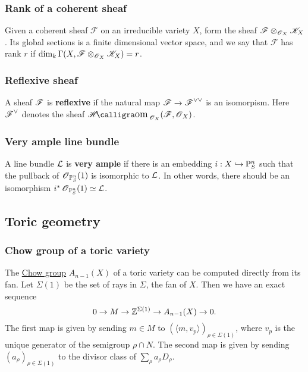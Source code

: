 \documentclass[11pt, english]{article}
\begin{document}
\subsubsection{Rank of a coherent sheaf}
\label{ranksheaf}

Given a coherent sheaf $\mathscr F$ on an irreducible variety $X$, form the sheaf ${\mathscr F \otimes_{\operatorname{\mathscr{O}}_X} \mathscr K_X}$. Its global sections is a finite dimensional vector space, and we say that $\mathscr F$ has rank $r$ if $\dim_k \Gamma(X,\mathscr F \otimes_{\operatorname{\mathscr{O}}_X} \mathscr K_X) = r$.

\subsubsection{Reflexive sheaf}
\label{reflexivesheaf}

A sheaf $\operatorname{\mathscr{F}}$ is \textbf{reflexive} if the natural map $\operatorname{\mathscr{F}} \to \operatorname{\mathscr{F}}^{\vee\vee}$ is an isomorpism. Here $\operatorname{\mathscr{F}}^\vee$ denotes the sheaf $\Shom_{\OO_X}(\FF,\OO_X)$.

\subsubsection{Very ample line bundle}
\label{veryample}
A line bundle $\mathcal{L}$ is \textbf{very ample} if there is an embedding $i:X \hookrightarrow \mathbb{P}_S^n$ such that the pullback of $\operatorname{\mathscr{O}}_{\mathbb{P}_S^n}(1)$ is isomorphic to $\mathcal{L}$. In other words, there should be an isomorphism $i^\ast \operatorname{\mathscr{O}}_{\mathbb{P}^n_S}(1) \simeq \mathcal{L}$.

\subsection{Toric geometry}

\subsubsection{Chow group of a toric variety}
\label{chowtoric}

The \hyperref[chowgroup]{Chow group} $A_{n-1}(X)$ of a toric variety can be computed directly from its fan. Let $\Sigma(1)$ be the set of rays in $\Sigma$, the fan of $X$. Then we have an exact sequence
\[
 0 \to M \to \mathbb{Z}^{\Sigma(1)} \to A_{n-1}(X) \to 0.
\] 
The first map is given by sending $m \in M$ to $(\langle m,v_p \rangle )_{\rho \in \Sigma(1)}$, where $v_p$ is the unique generator of the semigroup $\rho \cap N$. The second map is given by sending $(a_\rho)_{\rho \in \Sigma(1)}$ to the divisor class of $\sum_\rho  a_\rho D_\rho$. 
\end{document}
